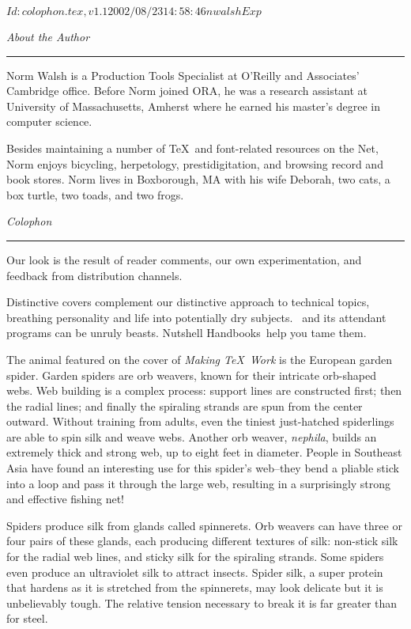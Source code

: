 \RCSID$Id: colophon.tex,v 1.1 2002/08/23 14:58:46 nwalsh Exp $
\cleardoublepage
\pagestyle{empty}

\begin{center}
\Large \textit{About the Author}
\end{center}
\vskip4pt
\hrule
\vskip6pt

Norm Walsh is a Production Tools Specialist at O'Reilly and Associates'
Cambridge office. Before Norm joined ORA, he was a research assistant
at University of Massachusetts, Amherst where he earned his master's degree in computer science.

Besides maintaining a number of \TeX\ and font-related resources on
the Net, Norm enjoys bicycling, herpetology, prestidigitation, and
browsing record and book stores. Norm lives in Boxborough, MA with
his wife Deborah, two cats, a box turtle, two toads, and two frogs.

\begin{center}
\Large \textit{Colophon}
\end{center}
\vskip4pt
\hrule
\vskip6pt

Our look is the result of reader comments, our own experimentation,
and feedback from distribution channels.

Distinctive covers complement our distinctive approach to
technical topics, breathing personality and life into potentially
dry subjects. \Unix\ and its attendant programs can be unruly beasts.
Nutshell Handbooks\regtm\ help you tame them.

The animal featured on the cover of \textit{Making \TeX\ Work} is
the European garden spider. Garden spiders are orb weavers,
known for their intricate orb-shaped webs. Web building is a
complex process: support lines are constructed first; then the
radial lines; and finally the spiraling strands are spun from
the center outward. Without training from adults, even the tiniest
just-hatched spiderlings are able to spin silk and weave webs.
Another orb weaver, \textit{nephila}, builds an extremely thick and
strong web, up to eight feet in diameter. People in Southeast Asia
have found an interesting use for this spider's web--they bend
a pliable stick into a loop and pass it through the large web,
resulting in a surprisingly strong and effective fishing net!

Spiders produce silk from glands called spinnerets. Orb weavers can have
three or four pairs of these glands, each producing different textures
of silk: non-stick silk for the radial web lines, and sticky silk
for the spiraling strands. Some spiders even produce an ultraviolet silk
to attract insects. Spider silk, a super protein that hardens as it
is stretched from the spinnerets, may look delicate but it is unbelievably
tough. The relative tension necessary to break it is far greater
than for steel.

